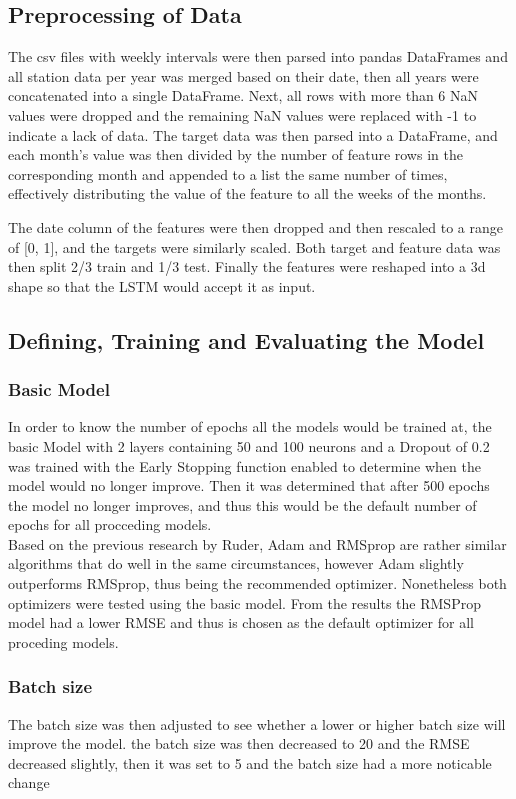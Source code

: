 \documentclass[10pt,11pt,12pt,oneside]{book}
\begin{document}
\subsection{Preprocessing of Data}
The csv files with weekly intervals were then parsed into pandas DataFrames and all station data per year was merged based on their date, then all years were concatenated into a single DataFrame. Next, all rows with more than 6 NaN values were dropped and the remaining NaN values were replaced with -1 to indicate a lack of data. The target data was then parsed into a DataFrame, and each month's value was then divided by the number of feature rows in the corresponding month and appended
to a list the same number of times, effectively distributing the value of the feature to all the weeks of the months.

The date column of the features were then dropped and then rescaled to a range of [0, 1], and the targets were similarly scaled. Both target and feature data was then split 2/3 train and 1/3 test. Finally the features were reshaped into a 3d shape so that the LSTM would accept it as input.
\subsection{Defining, Training and Evaluating the Model}
\subsubsection{Basic Model}
In order to know the number of epochs all the models would be trained at, the basic Model with 2 layers containing 50 and 100 neurons and a Dropout of 0.2 was trained with the Early Stopping function enabled to determine when the model would no longer improve. Then it was determined that after 500 epochs the model no longer improves, and thus this would be the default number of epochs for all procceding models.\\ Based on the previous research by Ruder, Adam
and RMSprop are rather similar algorithms that do well in the same circumstances, however Adam slightly outperforms RMSprop, thus being the recommended optimizer. \cite{DBLP:journals/corr/Ruder16} Nonetheless both optimizers were tested using the basic model. From the results the RMSProp model had a lower RMSE and thus is chosen as the default optimizer for all proceding models.
\subsubsection{Batch size}
The batch size was then adjusted to see whether a lower or higher batch size will improve the model. the batch size was then decreased to 20 and the RMSE decreased slightly, then it was set to 5 and the batch size had a more noticable change
\end{document}
